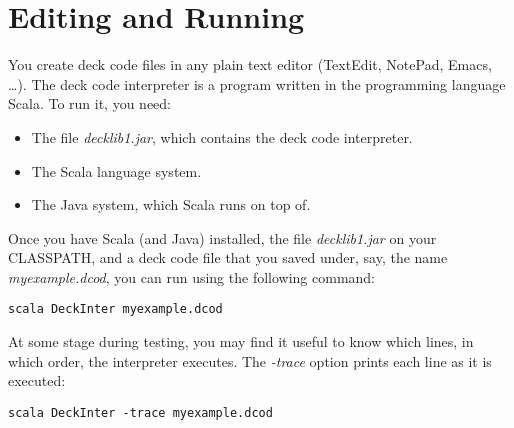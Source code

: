 \documentclass[a4paper,twoside]{tufte-handout}
\begin{document}
\section{Editing and Running}\label{sec-editrun}

You create deck code files in any plain text editor (TextEdit,
NotePad, Emacs, \dots). The deck code interpreter is a program written
in the programming language Scala. To run it, you need:
\begin{itemize}
\item The file \emph{decklib1.jar}, which contains the deck code
  interpreter.
\item The Scala language system.
\item The Java system, which Scala runs on top of.
\end{itemize}

Once you have Scala (and Java) installed, the file \emph{decklib1.jar}
on your CLASSPATH, and a deck code file that you saved under, say, the
name \emph{myexample.dcod}, you can run using the following command:
\begin{lstlisting}
scala DeckInter myexample.dcod
\end{lstlisting}

At some stage during testing, you may find it useful to know which
lines, in which order, the interpreter executes. The \emph{-trace}
option prints each line as it is executed:
\begin{lstlisting}
scala DeckInter -trace myexample.dcod
\end{lstlisting}
\end{document}
